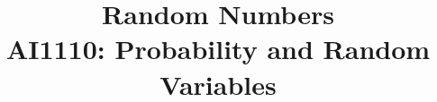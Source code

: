 \documentclass[journal,12pt,twocolumn]{IEEEtran}
\renewcommand\thesection{\arabic{section}}
\begin{document}
\let\StandardTheFigure\thefigure
\renewcommand{\thefigure}{\thesection}



\makeatletter
{}
\makeatother

\let\StandardTheFigure\thefigure
\let\StandardTheTable\thetable
\let\vec\mathbf
{}

\vspace{3cm}


\title{%
	\LARGE{\textbf{Random Numbers}\\AI1110: Probability and Random Variables}
}


%
%
%
\end{document}
